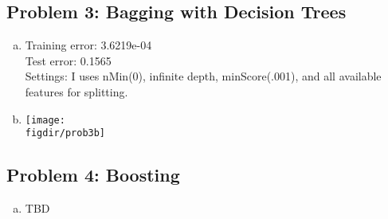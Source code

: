 \documentclass[twoside,11pt]{article}
\newcommand{\figdir}{figs}
\theoremstyle{definition}
\begin{document}

\subsection*{Problem 3: Bagging with Decision Trees}

\begin{enumerate}[(a)]
\item Training error: 3.6219e-04 \\
Test error: 0.1565 \\
Settings: I uses nMin(0), infinite depth, minScore(.001), and all available features for splitting.

\item \texttt{[image: \\figdir/prob3b]}
\end{enumerate}


\subsection*{Problem 4: Boosting}

\begin{enumerate}[(a)]
\item TBD
\end{enumerate}
\end{document}
